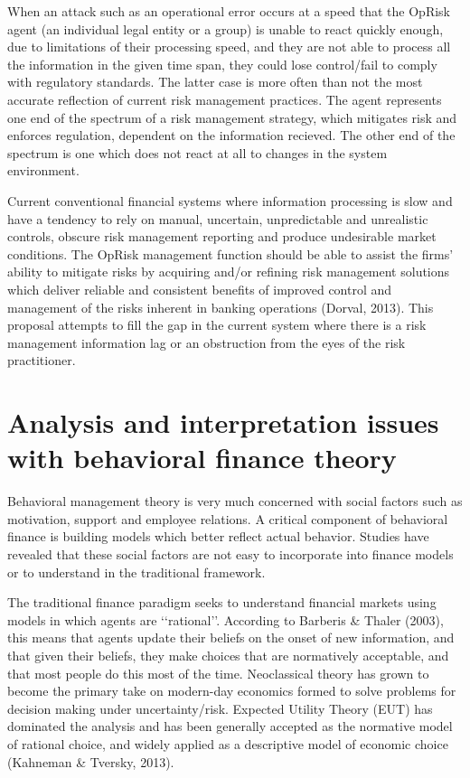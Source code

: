 \documentclass{DissertateUSU}
\begin{document}
When an attack such as an operational error occurs at a speed that the
OpRisk agent (an individual legal entity or a group) is unable to react
quickly enough, due to limitations of their processing speed, and they
are not able to process all the information in the given time span, they
could lose control/fail to comply with regulatory standards. The latter
case is more often than not the most accurate reflection of current risk
management practices. The agent represents one end of the spectrum of a
risk management strategy, which mitigates risk and enforces regulation,
dependent on the information recieved. The other end of the spectrum is
one which does not react at all to changes in the system
environment.\medskip 

Current conventional financial systems where information processing is
slow and have a tendency to rely on manual, uncertain, unpredictable and
unrealistic controls, obscure risk management reporting and produce
undesirable market conditions. The OpRisk management function should be
able to assist the firms' ability to mitigate risks by acquiring and/or
refining risk management solutions which deliver reliable and consistent
benefits of improved control and management of the risks inherent in
banking operations (Dorval, 2013). This proposal attempts to fill the
gap in the current system where there is a risk management information
lag or an obstruction from the eyes of the risk practitioner.

\section{Analysis and interpretation issues with behavioral finance theory}
\label{sec:Analysis and interpretation issues with behavioral finance theory}

Behavioral management theory is very much concerned with social factors
such as motivation, support and employee relations. A critical component
of behavioral finance is building models which better reflect actual
behavior. Studies have revealed that these social factors are not easy
to incorporate into finance models or to understand in the traditional
framework.\medskip 

The traditional finance paradigm seeks to understand financial markets
using models in which agents are \lq\lq rational\rq\rq. According to
Barberis \& Thaler (2003), this means that agents update their beliefs
on the onset of new information, and that given their beliefs, they make
choices that are normatively acceptable, and that most people do this
most of the time. Neoclassical theory has grown to become the primary
take on modern-day economics formed to solve problems for decision
making under uncertainty/risk. Expected Utility Theory (EUT) has
dominated the analysis and has been generally accepted as the normative
model of rational choice, and widely applied as a descriptive model of
economic choice (Kahneman \& Tversky, 2013).
\end{document}
